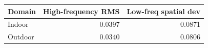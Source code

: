 \begin{tabular}{lrr}
\toprule
Domain & High-frequency RMS & Low-freq spatial dev \\
\midrule
Indoor & 0.0397 & 0.0871 \\
Outdoor & 0.0340 & 0.0806 \\
\bottomrule
\end{tabular}